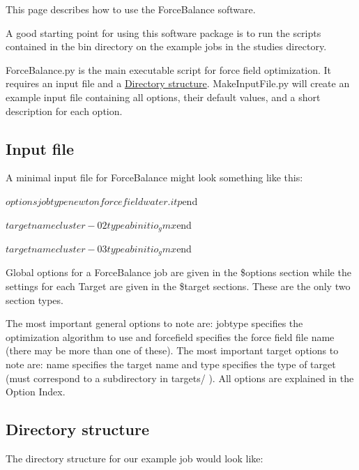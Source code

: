 \-This page describes how to use the \-Force\-Balance software.

\-A good starting point for using this software package is to run the scripts contained in the {\ttfamily bin} directory on the example jobs in the {\ttfamily studies} directory.

{\ttfamily \-Force\-Balance.\-py} is the main executable script for force field optimization. \-It requires an input file and a \hyperlink{usage_directory_structure}{\-Directory structure}. {\ttfamily \-Make\-Input\-File.\-py} will create an example input file containing all options, their default values, and a short description for each option.\hypertarget{usage_input_file}{}\subsection{\-Input file}\label{usage_input_file}
\-A minimal input file for \-Force\-Balance might look something like this\-:

\begin{DoxyVerb}

$options
jobtype newton
forcefield water.itp
$end

$target
name cluster-02
type abinitio_gmx
$end

$target
name cluster-03
type abinitio_gmx
$end

\end{DoxyVerb}


\-Global options for a \-Force\-Balance job are given in the {\ttfamily \$options} section while the settings for each \-Target are given in the {\ttfamily \$target} sections. \-These are the only two section types.

\-The most important general options to note are\-: {\ttfamily jobtype} specifies the optimization algorithm to use and {\ttfamily forcefield} specifies the force field file name (there may be more than one of these). \-The most important target options to note are\-: {\ttfamily name} specifies the target name and {\ttfamily type} specifies the type of target (must correspond to a subdirectory in {\ttfamily targets/} ). \-All options are explained in the \-Option \-Index.\hypertarget{usage_directory_structure}{}\subsection{\-Directory structure}\label{usage_directory_structure}
\-The directory structure for our example job would look like\-:

